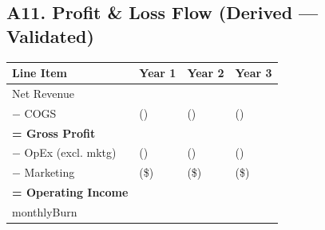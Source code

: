 \subsection*{A11. Profit \& Loss Flow (Derived --- Validated)}
\begin{tabularx}{\linewidth}{l Y Y Y}
\toprule
\textbf{Line Item} & \textbf{Year 1} & \textbf{Year 2} & \textbf{Year 3} \\\midrule
Net Revenue & \validatemoney{\actualSubRevenueYearOne}{\HCactualSubRevenueYearOne} & \validatemoney{\actualSubRevenueYearTwo}{\HCactualSubRevenueYearTwo} & \validatemoney{\actualSubRevenueYearThree}{\HCactualSubRevenueYearThree} \\
$-$ COGS & (\validatemoney{\totalCogsYearOne}{\HCtotalCogsYearOne}) & (\validatemoney{\totalCogsYearTwo}{\HCtotalCogsYearTwo}) & (\validatemoney{\totalCogsYearThree}{\HCtotalCogsYearThree}) \\
\textbf{= Gross Profit} & \validatemoney{\grossProfitYearOne}{\HCgrossProfitYearOne} & \validatemoney{\grossProfitYearTwo}{\HCgrossProfitYearTwo} & \validatemoney{\grossProfitYearThree}{\HCgrossProfitYearThree} \\
$-$ OpEx (excl. mktg) & (\validatemoney{\totalOpexYearOne}{\HCtotalOpexYearOne}) & (\validatemoney{\totalOpexYearTwo}{\HCtotalOpexYearTwo}) & (\validatemoney{\totalOpexYearThree}{\HCtotalOpexYearThree}) \\
$-$ Marketing & (\$\numint{\marketingBudgetYearOne}) & (\$\numint{\marketingBudgetYearTwo}) & (\$\numint{\marketingBudgetYearThree}) \\
\textbf{= Operating Income} & \validatemoney{\operatingIncomeYearOne}{\HCoperatingIncomeYearOne} & \validatemoney{\operatingIncomeYearTwo}{\HCoperatingIncomeYearTwo} & \validatemoney{\operatingIncomeYearThree}{\HCoperatingIncomeYearThree} \\\midrule
monthlyBurn & \validatemoney{\monthlyBurnYearOne}{\HCmonthlyBurnYearOne} & \validatemoney{\monthlyBurnYearTwo}{\HCmonthlyBurnYearTwo} & \validatemoney{\monthlyBurnYearThree}{\HCmonthlyBurnYearThree} \\
\bottomrule
\end{tabularx}

